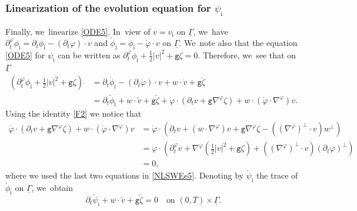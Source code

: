 \documentclass[11pt]{article}
\newcommand{\gr}{{\mathtt g}}
\newcommand{\dt}{\partial_t}
\newcommand{\ul}[1]{\underline{#1}}
\newcommand{\itGamma}{\mathit{\Gamma}}
\theoremstyle{definition}
\begin{document}
\subsubsection{Linearization of the evolution equation for $\psi_\mathrm{i}$}
Finally, we~linearize \eqref{ODE5}. In~view of $v=v_\mathrm{i}$ on $\ul{\itGamma}$, we~have $\dt^\varphi\phi_\mathrm{i}=\dt\phi_\mathrm{i}-(\dt\varphi)\cdot v$ and
$\check{\phi}_\mathrm{i}=\dot{\phi}_\mathrm{i}-\dot{\varphi}\cdot v$ on $\ul{\itGamma}$. We~note also that the equation \eqref{ODE5} for $\psi_\mathrm{i}$ can be written as $\dt^\varphi\phi_\mathrm{i}+\tfrac12|v|^2+\gr\zeta=0$.
Therefore, we~see that on $\ul{\itGamma}$
\begin{align*}
(\dt^\varphi\phi_\mathrm{i}+\tfrac12|v|^2+\gr\zeta)\,\dot{}
&= \dt\dot{\phi}_\mathrm{i}-(\dt\dot{\varphi})\cdot v + w\cdot\dot{v}+\gr\dot{\zeta} \\
&= \dt\check{\phi}_\mathrm{i}+w\cdot\check{v}+\gr\check{\zeta} + \dot{\varphi}\cdot(\dt v+\gr\nabla^\varphi\zeta) + w\cdot(\dot{\varphi}\cdot\nabla^\varphi)v.
\end{align*}
Using the identity \eqref{F2} we notice that
\begin{align*}
\dot{\varphi}\cdot(\dt v+\gr\nabla^\varphi\zeta) + w\cdot(\dot{\varphi}\cdot\nabla^\varphi)v
&= \dot{\varphi}\cdot(\dt v+(w\cdot\nabla^\varphi)v+\gr\nabla^\varphi\zeta - ((\nabla^\varphi)^\perp\cdot v)w^\perp) \\
&= \dot{\varphi}\cdot(\dt^\varphi v+\nabla^\varphi(\tfrac12|v|^2+\gr\zeta) + ((\nabla^\varphi)^\perp\cdot v)(\dt\varphi)^\perp) \\
&= 0,
\end{align*}
where we used the last two equations in \eqref{NLSWEe5}.
Denoting by $\check{\psi}_\mathrm{i}$ the trace of $\check{\phi}_\mathrm{i}$ on $\ul{\itGamma}$, we~obtain
\begin{equation}\label{LODE1}
\dt\check{\psi}_\mathrm{i}+w\cdot\check{v}+\gr\check{\zeta}=0 \quad\text{on } (0,T)\times\ul{\itGamma}.
\end{equation}
\end{document}
